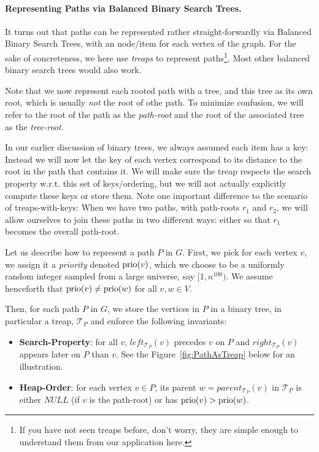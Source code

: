 \paragraph{Representing Paths via Balanced Binary Search Trees.} It turns out that paths can be represented rather straight-forwardly via Balanced Binary Search Trees, with an node/item for each vertex of the graph. For the sake of concreteness, we here use \emph{treaps} to represent paths\footnote{If you have not seen treaps before, don't worry, they are simple enough to understand them from our application here. }.
Most other balanced binary search trees would also work.

Note that we now represent each rooted path with a tree, and this tree as its own root, which is usually \emph{not} the root of othe path. To minimize confusion, we will refer to the root of the path as the \emph{path-root} and the root of the associated tree as the \emph{tree-root}. 

In our earlier discussion of binary trees, we always assumed each item has a key: Instead we will now let the key of each vertex correspond to its distance to the root in the path that contains it.
We will make sure the treap respects the search property w.r.t. this set of keys/ordering, but we will not actually explicitly compute these keys or store them.
Note one important difference to the scenario of treaps-with-keys: When we have two paths, with path-roots $r_1$ and $r_2$, we will allow ourselves to join these paths in two different ways: either so that $r_1$ becomes the overall path-root.

Let us describe how to represent a path $P$ in $G$. First, we pick for each vertex $v$, we assign it a \emph{priority} denoted $\operatorname{prio}(v)$, which we choose to be a uniformly random integer sampled from a large universe, say $[1, n^{100})$. We assume henceforth that $\operatorname{prio}(v) \neq \operatorname{prio}(w)$ for all $v,w\in V$.

Then, for each path $P$ in $G$, we store the vertices in $P$ in a binary tree, in particular a treap, $\mathcal{T}_{P}$ and enforce the following invariants:
\begin{itemize}
      \item \textbf{Search-Property}: for all $v$, $left_{\mathcal{T}_{P}}(v)$ precedes $v$ on $P$ and $right_{\mathcal{T}_{P}}(v)$ appears later on $P$ than $v$. See the Figure~\ref{fig:PathAsTreap} below for an illustration.
    \item \textbf{Heap-Order}: for each vertex $v \in P$, its parent $w = parent_{\mathcal{T}_{P}}(v)$ in $\mathcal{T}_{P}$ is either $NULL$ (if $v$ is the path-root) or has $\operatorname{prio}(v) > \operatorname{prio}(w)$.
\end{itemize}

